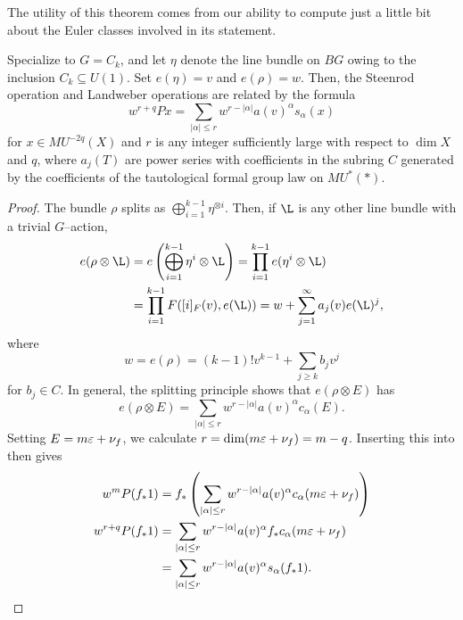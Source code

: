 The utility of this theorem comes from our ability to compute just a little bit about the Euler classes involved in its statement.

\begin{corollary}\label{QuillensKeyRelation}
 Specialize to $G = C_k$, and let $\eta$ denote the line bundle on $BG$ owing to the inclusion $C_k \subseteq U(1)$.  Set $e(\eta) = v$ and $e(\rho) = w$.  Then, the Steenrod operation and Landweber operations are related by the formula \[w^{r+q} P x = \sum_{|\alpha| \le r} w^{r - |\alpha|} a(v)^\alpha s_\alpha(x)\] for $x \in MU^{-2q}(X)$ and $r$ is any integer sufficiently large with respect to $\dim X$ and $q$, where $a_j(T)$ are power series with coefficients in the subring $C$ generated by the coefficients of the tautological formal group law on $MU^*(*)$.
\end{corollary}
\begin{proof}
The bundle $\rho$ splits as $\bigoplus_{i=1}^{k-1} \eta^{\otimes i}$.  Then, if $\L$ is any other line bundle with a trivial $G$--action,
\begin{align*}
e(\rho \otimes \L) & = e \left( \bigoplus_{i=1}^{k-1} \eta^i \otimes \L \right) = \prod_{i=1}^{k-1} e(\eta^i \otimes \L) \\
& = \prod_{i=1}^{k-1} F([i]_F(v), e(\L)) = w + \sum_{j=1}^\infty a_j(v) e(\L)^j,
\end{align*}
where \[w = e(\rho) = (k-1)! v^{k-1} + \sum_{j \ge k} b_j v^j\] for $b_j \in C$.  In general, the splitting principle shows that $e(\rho \otimes E)$ has \[e(\rho \otimes E) = \sum_{|\alpha| \le r} w^{r-|\alpha|} a(v)^\alpha c_\alpha(E).\]  Setting $E = m \varepsilon + \nu_f$, we calculate $r = \dim(m \varepsilon + \nu_f) = m - q$.    Inserting this into  then gives
\begin{align*}
w^m P(f_* 1) & = f_* \left( \sum_{|\alpha| \le r} w^{r - |\alpha|} a(v)^\alpha c_\alpha(m \varepsilon + \nu_f) \right) \\
w^{r+q} P(f_* 1) & = \sum_{|\alpha| \le r} w^{r - |\alpha|} a(v)^\alpha f_* c_\alpha(m \varepsilon + \nu_f) \\
& = \sum_{|\alpha| \le r} w^{r - |\alpha|} a(v)^\alpha s_\alpha(f_* 1). \qedhere
\end{align*}
\end{proof}

